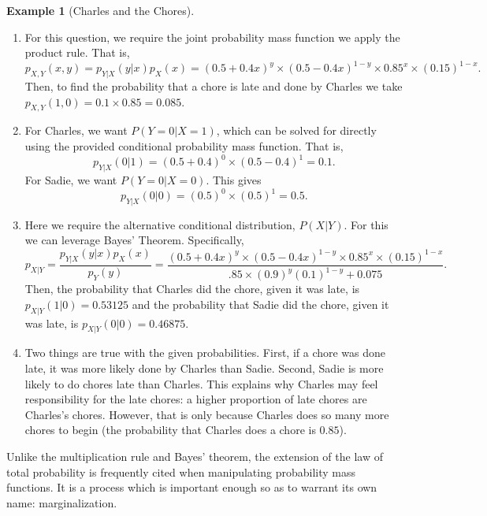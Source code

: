 \documentclass[
  letterpaper,
  DIV=11,
  numbers=noendperiod]{scrreprt}
\theoremstyle{definition}
\theoremstyle{definition}
\newtheorem{example}{Example}[chapter]
\theoremstyle{definition}
\theoremstyle{remark}
\begin{document}
\begin{example}[Charles and the
Chores]
\begin{tcolorbox}[enhanced jigsaw, colback=white, colframe=quarto-callout-color-frame, arc=.35mm, leftrule=.75mm, rightrule=.15mm, opacityback=0, breakable, bottomrule=.15mm, left=2mm, toprule=.15mm]
\begin{enumerate}
\def\labelenumi{\alph{enumi}.}
\item
  For this question, we require the joint probability mass function we
  apply the product rule. That is,
  \[p_{X,Y}(x,y) = p_{Y|X}(y|x)p_{X}(x) = (0.5 + 0.4x)^{y}\times(0.5 - 0.4x)^{1-y}\times0.85^{x}\times(0.15)^{1-x}.\]
  Then, to find the probability that a chore is late and done by Charles
  we take \(p_{X,Y}(1,0) = 0.1\times 0.85 = 0.085.\)
\item
  For Charles, we want \(P(Y=0|X=1)\), which can be solved for directly
  using the provided conditional probability mass function. That is,
  \[p_{Y|X}(0|1) = (0.5 + 0.4)^{0}\times(0.5 - 0.4)^{1} = 0.1.\] For
  Sadie, we want \(P(Y=0|X=0)\). This gives
  \[p_{Y|X}(0|0) = (0.5)^{0}\times(0.5)^{1} = 0.5.\]
\item
  Here we require the alternative conditional distribution, \(P(X|Y)\).
  For this we can leverage Bayes' Theorem. Specifically,
  \[p_{X|Y} = \frac{p_{Y|X}(y|x)p_{X}(x)}{p_{Y}(y)} = \frac{(0.5 + 0.4x)^{y}\times(0.5 - 0.4x)^{1-y}\times0.85^{x}\times(0.15)^{1-x}}{.85\times(0.9)^y(0.1)^{1-y} + 0.075}.\]
  Then, the probability that Charles did the chore, given it was late,
  is \(p_{X|Y}(1|0) = 0.53125\) and the probability that Sadie did the
  chore, given it was late, is \(p_{X|Y}(0|0) = 0.46875\).
\item
  Two things are true with the given probabilities. First, if a chore
  was done late, it was more likely done by Charles than Sadie. Second,
  Sadie is more likely to do chores late than Charles. This explains why
  Charles may feel responsibility for the late chores: a higher
  proportion of late chores are Charles's chores. However, that is only
  because Charles does so many more chores to begin (the probability
  that Charles does a chore is \(0.85\)).\footnotemark{}
\end{enumerate}

\end{tcolorbox}


\end{example}

Unlike the multiplication rule and Bayes' theorem, the extension of the
law of total probability is frequently cited when manipulating
probability mass functions. It is a process which is important enough so
as to warrant its own name: marginalization.
\end{document}
